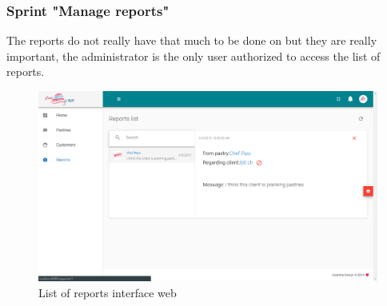 \documentclass[12pt,a4paper]{report}
\begin{document}
\subsubsection*{Sprint "Manage reports"}
The reports do not really have that much to be done on but they are really important, the administrator is the only user authorized to access the list of reports.
\begin{figure}[H]
	\centering
	\includegraphics[width=5.6in,keepaspectratio]{listreports.png}
	\caption{List of reports interface web}
	\label{listreports-interface}
\end{figure}
\end{document}
